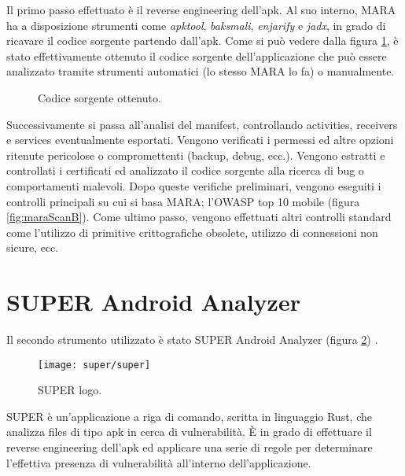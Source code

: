 Il primo passo effettuato è il reverse engineering dell'apk. Al suo interno, MARA ha a disposizione strumenti come \emph{apktool}, \emph{baksmali}, \emph{enjarify} e \emph{jadx}, in grado di ricavare il codice sorgente partendo dall'apk. Come si può vedere dalla figura \ref{fig:source}, è stato effettivamente ottenuto il codice sorgente dell'applicazione che può essere analizzato tramite strumenti automatici (lo stesso MARA lo fa) o manualmente.

\begin{figure}[h]
	\centering 
	\caption{Codice sorgente ottenuto.}
	\label{fig:source} 
\end{figure}

Successivamente si passa all'analisi del manifest, controllando activities, receivers e services eventualmente esportati. Vengono verificati i permessi ed altre opzioni ritenute pericolose o compromettenti (backup, debug, ecc.). Vengono estratti e controllati i certificati ed analizzato il codice sorgente alla ricerca di bug o comportamenti malevoli. Dopo queste verifiche preliminari, vengono eseguiti i controlli principali su cui si basa MARA; l'OWASP top 10 mobile (figura \ref{fig:maraScanB}). Come ultimo passo, vengono effettuati altri controlli standard come l'utilizzo di primitive crittografiche obsolete, utilizzo di connessioni non sicure, ecc.


\section{SUPER Android Analyzer}

Il secondo strumento utilizzato è stato \ac{SUPER} Android Analyzer (figura \ref{fig:super}) \cite{SUPER}. 

\begin{figure}[h]
	\centering 
	\texttt{[image: super/super]} 
	\caption{SUPER logo.}
	\label{fig:super} 
\end{figure}

SUPER è un'applicazione a riga di comando, scritta in linguaggio Rust, che analizza files di tipo apk in cerca di vulnerabilità. È in grado di effettuare il reverse engineering dell'apk ed applicare una serie di regole per determinare l'effettiva presenza di vulnerabilità all'interno dell'applicazione. 

